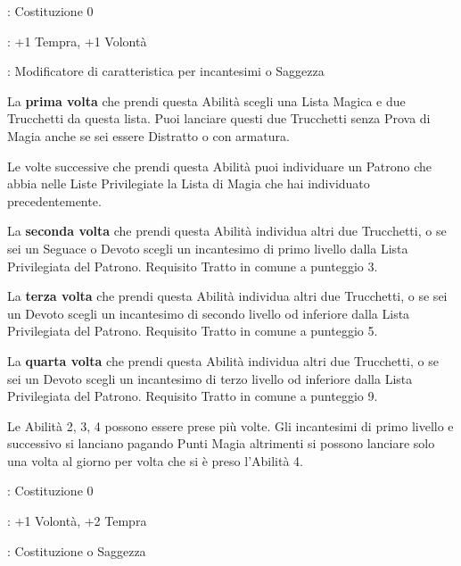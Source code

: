 \begin{multicols}{2}
\begin{description}[noitemsep, topsep=0pt, parsep=0pt, partopsep=0pt, leftmargin=0cm, labelwidth=2.5cm]
    \item[\textbf{Requisito}]: Costituzione 0
    \item[\textbf{Tiri Salvezza}]: +1 Tempra, +1 Volontà
    \item[\textbf{Caratteristica}]: Modificatore di caratteristica per incantesimi o Saggezza
\end{description}

La \textbf{prima volta} che prendi questa Abilità scegli una Lista Magica e due Trucchetti da questa lista. Puoi lanciare questi due Trucchetti senza Prova di Magia anche se sei essere Distratto o con armatura.

Le volte successive che prendi questa Abilità puoi individuare un Patrono che abbia nelle Liste Privilegiate la Lista di Magia che hai individuato precedentemente.

La \textbf{seconda volta} che prendi questa Abilità individua altri due Trucchetti, o se sei un Seguace o Devoto scegli un incantesimo di primo livello dalla Lista Privilegiata del Patrono. Requisito Tratto in comune a punteggio 3.

La \textbf{terza volta} che prendi questa Abilità individua altri due Trucchetti, o se sei un Devoto scegli un incantesimo di secondo livello od inferiore dalla Lista Privilegiata del Patrono. Requisito Tratto in comune a punteggio 5.

La \textbf{quarta volta} che prendi questa Abilità individua altri due Trucchetti, o se sei un Devoto scegli un incantesimo di terzo livello od inferiore dalla Lista Privilegiata del Patrono. Requisito Tratto in comune a punteggio 9.

Le Abilità 2, 3, 4 possono essere prese più volte. Gli incantesimi di primo livello e successivo si lanciano pagando Punti Magia altrimenti si possono lanciare solo una volta al giorno per volta che si è preso l'Abilità 4.

\begin{description}[noitemsep, topsep=0pt, parsep=0pt, partopsep=0pt, leftmargin=0cm, labelwidth=2.5cm]
    \item[\textbf{Requisito}]: Costituzione 0
    \item[\textbf{Tiri Salvezza}]: +1 Volontà, +2 Tempra
    \item[\textbf{Caratteristica}]: Costituzione o Saggezza
\end{description}


\end{multicols}
